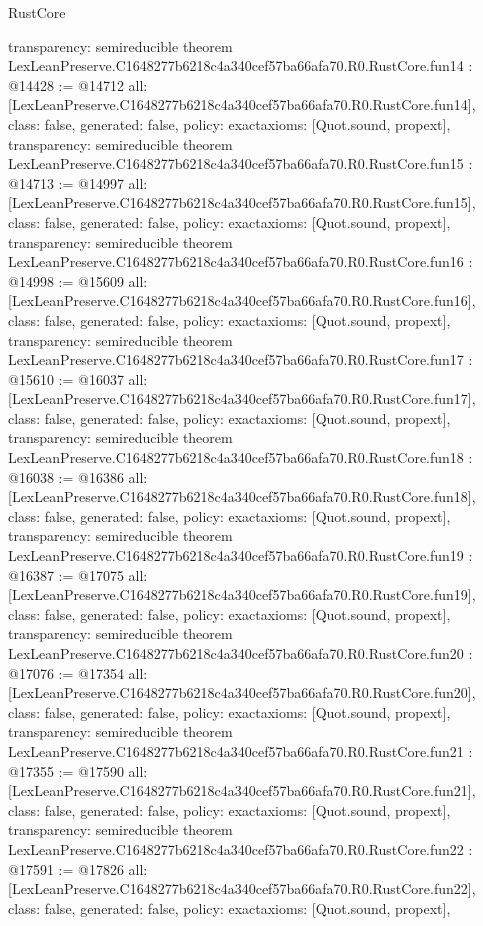 \begin{lexlean}{RustCore}
\begin{coremodule}
{  transparency: semireducible
}
theorem LexLeanPreserve.C1648277b6218c4a340cef57ba66afa70.R0.RustCore.fun14 : @14428 := @14712 {
  all: [LexLeanPreserve.C1648277b6218c4a340cef57ba66afa70.R0.RustCore.fun14],
  class: false,
  generated: false,
  policy: exact{axioms: [Quot.sound, propext]},
  transparency: semireducible
}
theorem LexLeanPreserve.C1648277b6218c4a340cef57ba66afa70.R0.RustCore.fun15 : @14713 := @14997 {
  all: [LexLeanPreserve.C1648277b6218c4a340cef57ba66afa70.R0.RustCore.fun15],
  class: false,
  generated: false,
  policy: exact{axioms: [Quot.sound, propext]},
  transparency: semireducible
}
theorem LexLeanPreserve.C1648277b6218c4a340cef57ba66afa70.R0.RustCore.fun16 : @14998 := @15609 {
  all: [LexLeanPreserve.C1648277b6218c4a340cef57ba66afa70.R0.RustCore.fun16],
  class: false,
  generated: false,
  policy: exact{axioms: [Quot.sound, propext]},
  transparency: semireducible
}
theorem LexLeanPreserve.C1648277b6218c4a340cef57ba66afa70.R0.RustCore.fun17 : @15610 := @16037 {
  all: [LexLeanPreserve.C1648277b6218c4a340cef57ba66afa70.R0.RustCore.fun17],
  class: false,
  generated: false,
  policy: exact{axioms: [Quot.sound, propext]},
  transparency: semireducible
}
theorem LexLeanPreserve.C1648277b6218c4a340cef57ba66afa70.R0.RustCore.fun18 : @16038 := @16386 {
  all: [LexLeanPreserve.C1648277b6218c4a340cef57ba66afa70.R0.RustCore.fun18],
  class: false,
  generated: false,
  policy: exact{axioms: [Quot.sound, propext]},
  transparency: semireducible
}
theorem LexLeanPreserve.C1648277b6218c4a340cef57ba66afa70.R0.RustCore.fun19 : @16387 := @17075 {
  all: [LexLeanPreserve.C1648277b6218c4a340cef57ba66afa70.R0.RustCore.fun19],
  class: false,
  generated: false,
  policy: exact{axioms: [Quot.sound, propext]},
  transparency: semireducible
}
theorem LexLeanPreserve.C1648277b6218c4a340cef57ba66afa70.R0.RustCore.fun20 : @17076 := @17354 {
  all: [LexLeanPreserve.C1648277b6218c4a340cef57ba66afa70.R0.RustCore.fun20],
  class: false,
  generated: false,
  policy: exact{axioms: [Quot.sound, propext]},
  transparency: semireducible
}
theorem LexLeanPreserve.C1648277b6218c4a340cef57ba66afa70.R0.RustCore.fun21 : @17355 := @17590 {
  all: [LexLeanPreserve.C1648277b6218c4a340cef57ba66afa70.R0.RustCore.fun21],
  class: false,
  generated: false,
  policy: exact{axioms: [Quot.sound, propext]},
  transparency: semireducible
}
theorem LexLeanPreserve.C1648277b6218c4a340cef57ba66afa70.R0.RustCore.fun22 : @17591 := @17826 {
  all: [LexLeanPreserve.C1648277b6218c4a340cef57ba66afa70.R0.RustCore.fun22],
  class: false,
  generated: false,
  policy: exact{axioms: [Quot.sound, propext]},
}
\end{coremodule}
\end{lexlean}
